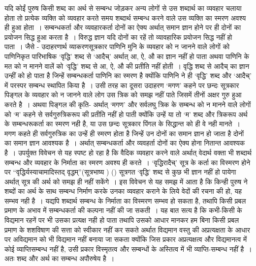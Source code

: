 यदि कोईं पुरुष किसी शब्द का अर्थ से सम्बन्ध जोड़कर अन्य लोगों से उस शब्दार्थ का व्यवहार चलाया होता तो प्रत्येक व्यक्ति को व्यवहार करते समय शब्दार्थ सम्बन्ध करने वाले उस व्यक्ति का स्मरण अवश्य ही हुआ होता~। सम्बन्धकर्ता और व्यवहारकर्ता दोनों का ऐक्य अर्थात् समान ज्ञान होने पर ही दोनों का प्रयोजन सिद्ध हुआ करता है~। विरुद्ध ज्ञान यदि दोनों का रहें तो व्यावहारिक प्रयोजन सिद्ध नहीं हो पाता~। जैसे - उदाहरणार्थ व्याकरणसूत्रकार पाणिनि मुनि के व्यवहार को न जानने वाले लोगों को पाणिनिकृत पारिभाषिक ‘वृद्धि' शब्द से ‘आदैच्' अर्थात् आ, ऐ, औ का ज्ञान नहीं हो पाता अथवा पाणिनि के मत को न मानने वालें को ‘वृद्धि' शब्द से आ, ऐ, औ की प्रतीति नहीं होती~। वृद्धि शब्द से आदैच् का ज्ञान उन्हीं को हो पाता है जिन्हें सम्बन्धकर्ता पाणिनि का स्मरण है क्योंकि पाणिनि ने ही ‘वृद्धि' शब्द और ‘आदैच्' में परस्पर सम्बन्ध स्थापित किया है~। उसी तरह का दूसरा उदाहरण ‘मगण' कहने पर छन्दः सूत्रकार पिङ्गल के व्यवहार को न जानने वाले लोग उस त्रिक को समझ नहीं पाते जिसमें तीनों अक्षर गुरु हुआ करते है~। अथवा पिङ्गल की कृति- अर्थात् ‘मगण' और सर्वलघु त्रिक के सम्बन्ध को न मानने वाले लोगों को ‘म' कहने से सर्वगुरुत्रिकरूप की प्रतीति नहीं हो पाती क्योंकि उन्हें या तो ‘म' शब्द और त्रिकरूप अर्थ के सम्बन्धरूकर्ता का स्मरण नही है, या उस छन्दः सूत्रकार पिंगल के सिद्धान्त को ही वे नही मानते~। मगण कहते ही सर्वगुरुत्रिक का उन्हें ही स्मरण होता है जिन्हें उन दोनों का समान ज्ञान हो जाता है दोनों का समान ज्ञान आवश्यक है~। अर्थात् सम्बन्धकर्ता और व्यवहर्ता दोनों का ऐक्य होना नितान्त आवश्यक है~। उपर्युक्त विवेचन से यह स्पष्ट हो रहा है कि वैदिक व्यवहार करने वाले अर्थात् वेदार्थ वक्ता भी शब्दार्थ सम्बन्ध और व्यवहार के निर्माता का स्मरण अवश्य ही करते~। ‘वृद्धिरादैच्' सूत्र के कर्ता का विस्मरण होने पर “वृद्धिर्यस्याचामादिस्तद् वृद्धम्”(सूत्रभाष्य ) () सूत्रगत ‘वृद्धि' शब्द से कुछ भी ज्ञान नहीं हो पायेगा अर्थात् सूत्र की अर्थ को समझ ही नहीं सकेंगे~। इस विवेचन से यह समझ में आता है कि किन्ही पुरुष ने शब्दों का अर्थ के साथ सम्बन्ध निर्माण करके उनका व्यवहार कराने के लिये वेदों की रचना की हो, यह सम्भव नही है~। यद्यपि शब्दार्थ सम्बन्ध के निर्माता का विस्मरण सम्भव हो सकता है, तथापि किसी प्रबल प्रमाण के अभाव में सम्बन्धकर्ता की कल्पना नहीं की जा सकती~। यह बात सत्य है कि कभी-किसी के विद्यमान रहनें पर भी उसका प्रत्यक्ष नही हो पाता तथापि उसको आधार मानकर हम बिना किसी प्रबल प्रमाण के शशविषाण की सत्ता को स्वीकार नहीं कर सकते अर्थात विद्यमान वस्तु की अप्रत्यक्षता के आधार पर अविद्यमान को भी विद्यमान नहीं बनाया जा सकता क्योंकि जिस प्रकार अप्रत्यक्षत्व और विद्यमानत्व में कोई व्याप्तिसम्बन्ध नहीं है, उसी प्रकार विस्मृतत्व और सम्बन्धों के अस्तित्व में भी व्याप्ति-सम्बन्ध नहीं है~। अतः शब्द और अर्थ का सम्बन्ध अपौरुषेय है~।

